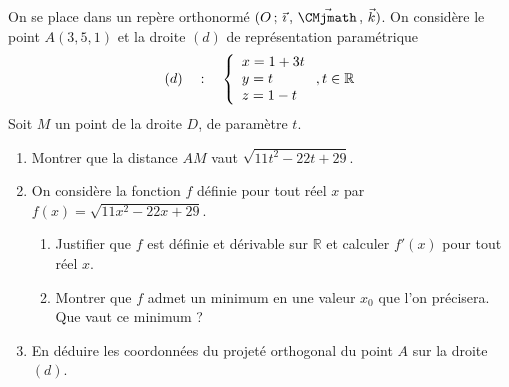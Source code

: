 \documentclass[11pt,fleqn, openany]{book} %
\begin{document}
\begin{exercise}[topic=geom15]On se place dans un repère orthonormé $\Oijk$. On considère le point $A(3,5,1)$ et la droite $(d)$ de représentation paramétrique
\[(d)\quad : \quad \left\{ \renewcommand{\arraystretch}{1}\renewcommand{\arraystretch}{1}\begin{array}{l}x=1+3t \\ y=t \\ z = 1-t \\\end{array}\right., t \in \mathbb{R}\]
Soit $M$ un point de la droite $D$, de paramètre $t$.
\begin{enumerate}
\item Montrer que la distance $AM$ vaut $\sqrt{11t^2-22t+29}$.
\item On considère la fonction $f$ définie pour tout réel $x$ par $f(x)=\sqrt{11x^2-22x+29}$.
\begin{enumerate}
\item Justifier que $f$ est définie et dérivable sur $\mathbb{R}$ et calculer $f'(x)$ pour tout réel $x$.
\item Montrer que $f$ admet un minimum en une valeur $x_0$ que l'on précisera. Que vaut ce minimum ?
\end{enumerate}
\item En déduire les coordonnées du projeté orthogonal du point $A$ sur la droite $(d)$.
\end{enumerate} \end{exercise}
\end{document}
